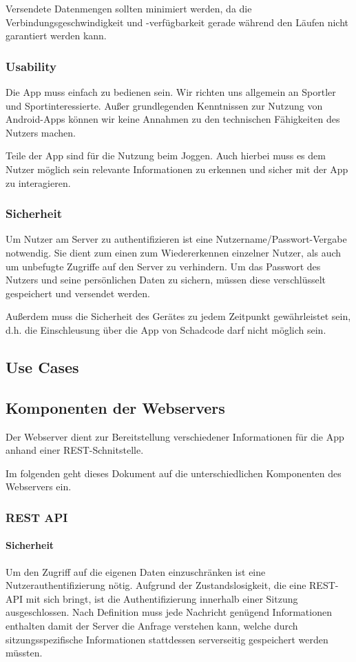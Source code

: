 Versendete Datenmengen sollten minimiert werden, da die Verbindungsgeschwindigkeit und -verfügbarkeit gerade während den Läufen nicht garantiert werden kann.
\subsubsection{Usability}
Die App muss einfach zu bedienen sein. Wir richten uns allgemein an Sportler und Sportinteressierte. Außer grundlegenden Kenntnissen zur Nutzung von Android-Apps können wir keine Annahmen zu den technischen Fähigkeiten des Nutzers machen.

Teile der App sind für die Nutzung beim Joggen. Auch hierbei muss es dem Nutzer möglich sein relevante Informationen zu erkennen und sicher mit der App zu interagieren.
\subsubsection{Sicherheit}
Um Nutzer am Server zu authentifizieren ist eine Nutzername/Passwort-Vergabe notwendig. Sie dient zum einen zum Wiedererkennen einzelner Nutzer, als auch um unbefugte Zugriffe auf den Server zu verhindern. Um das Passwort des Nutzers und seine persönlichen Daten zu sichern, müssen diese verschlüsselt gespeichert und versendet werden.

Außerdem muss die Sicherheit des Gerätes zu jedem Zeitpunkt gewährleistet sein, d.h. die Einschleusung über die App von Schadcode darf nicht möglich sein.
\subsection{Use Cases}
\subsection{Komponenten der Webservers}
Der Webserver dient zur Bereitstellung verschiedener Informationen für die App anhand einer REST-Schnitstelle. 

Im folgenden geht dieses Dokument auf die unterschiedlichen Komponenten des Webservers ein.
\subsubsection{REST API}
\paragraph{Sicherheit}
Um den Zugriff auf die eigenen Daten einzuschränken ist eine Nutzerauthentifizierung nötig. Aufgrund der Zustandslosigkeit, die eine REST-API mit sich bringt, ist die Authentifizierung innerhalb einer Sitzung ausgeschlossen. Nach Definition muss jede Nachricht genügend Informationen enthalten damit der Server die Anfrage verstehen kann, welche durch sitzungsspezifische Informationen stattdessen serverseitig gespeichert werden müssten.

